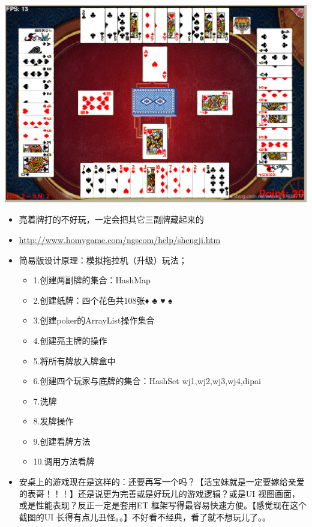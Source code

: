 \documentclass[9pt, b5paper]{article}
\begin{document}
\begin{center}
\includegraphics[width=.9\linewidth]{./pic/plan_20230508_221732.png}
\end{center}
\begin{itemize}
\item 亮着牌打的不好玩，一定会把其它三副牌藏起来的
\item \url{http://www.homygame.com/ngscom/help/shengji.htm}
\item 简易版设计原理：模拟拖拉机（升级）玩法；
\begin{itemize}
\item 1.创建两副牌的集合：HashMap
\item 2.创建纸牌：四个花色共108张♦ ♣ ♥ ♠
\item 3.创建poker的ArrayList操作集合
\item 4.创建亮主牌的操作
\item 5.将所有牌放入牌盒中
\item 6.创建四个玩家与底牌的集合：HashSet wj1,wj2,wj3,wj4,dipai
\item 7.洗牌
\item 8.发牌操作
\item 9.创建看牌方法
\item 10.调用方法看牌
\end{itemize}
\item 安桌上的游戏现在是这样的：还要再写一个吗？【活宝妹就是一定要嫁给亲爱的表哥！！！】还是说更为完善或是好玩儿的游戏逻辑？或是UI 视图画面，或是性能表现？反正一定是套用ET 框架写得最容易快速方便。【感觉现在这个截图的UI 长得有点儿丑怪。。】不好看不经典，看了就不想玩儿了。。
\end{itemize}
\end{document}
